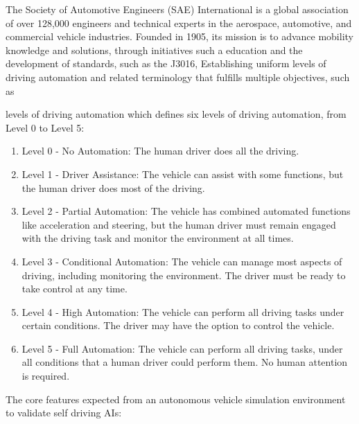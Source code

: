 The Society of Automotive Engineers (SAE) \cite{sae_org} International  is a global association of over 128,000 engineers and technical experts in the aerospace, automotive, and commercial vehicle industries. Founded in 1905, its mission is to advance mobility knowledge and solutions, through initiatives such a education and the development of standards, such as the J3016, Establishing uniform levels of driving automation and related terminology that fulfills multiple objectives, such as

levels of driving automation which defines six levels of driving automation, from Level 0 to Level 5:

\begin{enumerate}
    \item Level 0 - No Automation: The human driver does all the driving.
    \item Level 1 - Driver Assistance: The vehicle can assist with some functions, but the human driver does most of the driving.
    \item Level 2 - Partial Automation: The vehicle has combined automated functions like acceleration and steering, but the human driver must remain engaged with the driving task and monitor the environment at all times.
    \item Level 3 - Conditional Automation: The vehicle can manage most aspects of driving, including monitoring the environment. The driver must be ready to take control at any time.
    \item Level 4 - High Automation: The vehicle can perform all driving tasks under certain conditions. The driver may have the option to control the vehicle.
    \item Level 5 - Full Automation: The vehicle can perform all driving tasks, under all conditions that a human driver could perform them. No human attention is required.
\end{enumerate}

The core features expected from an autonomous vehicle simulation environment to validate self driving AIs:

